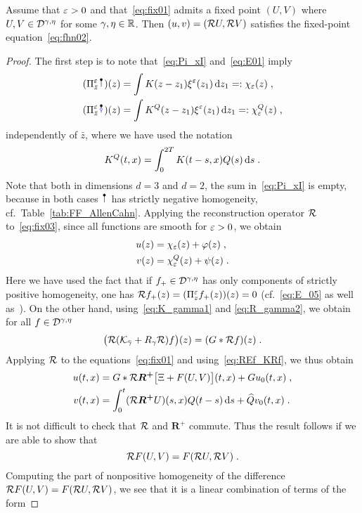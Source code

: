\documentclass[reqno,11pt]{article}
\def\Rplus{\boldsymbol{R^+}}
\def\KQ{K^Q}
\begin{document}
\begin{prop}
\label{prop:fixed_point_equiv}
Assume that $\varepsilon>0$ and that~\eqref{eq:fix01} admits a fixed point $(U,V)$
where $U, V\in{\mathcal D}^{\gamma,\eta}$ for some $\gamma, \eta\in\mathbb{R}$. Then $(u,v)=({\mathcal R}
U, {\mathcal R} V)$ satisfies the fixed-point equation~\eqref{eq:fhn02}.
\end{prop}
%
\begin{proof}
The first step is to note that~\eqref{eq:Pi_xI} and~\eqref{eq:E01} imply
\begin{align*}
 (\Pi_{\bar z}^\eps \RSI)(z) &= 
 \int K(z-z_1)\xi^\eps(z_1)\6z_1 =: \chi_\eps(z)\;, \\
 (\Pi_{\bar z}^\eps \RSoI)(z) &= 
 \int \KQ(z-z_1)\xi^\eps(z_1)\6z_1 =: \chi^Q_\eps(z)\;, 
\end{align*} 
independently of $\bar z$, where we have used the notation 
\[
 \KQ(t,x) = \int_0^{2T} K(t-s,x) Q(s)\6s\;.
\]
Note that both in dimensions $d=3$ and $d=2$, the sum in~\eqref{eq:Pi_xI}
is empty, because in both cases $\RSI$ has strictly negative homogeneity,
cf.\ Table~\ref{tab:FF_AllenCahn}.
Applying the reconstruction operator ${\mathcal R}$ to~\eqref{eq:fix03}, since all
functions are smooth for $\varepsilon>0$, we obtain
\begin{align*}
u(z) &= \chi_\varepsilon(z) + \varphi(z)\;, \\
v(z) &= \chi^Q_\varepsilon(z) + \psi(z)\;. 
\end{align*}
Here we have used the fact that if $f_+\in{\mathcal D}^{\gamma,\eta}$ has only components
of strictly positive homogeneity, one has ${\mathcal R} f_+(z) = (\Pi^\varepsilon_z f_+(z))(z) =
0$ (cf.~\eqref{eq:E_05} as well as~\cite[Prop.~3.28]{Hairer2014}). 
On the other hand, using~\eqref{eq:K_gamma1} and
\eqref{eq:R_gamma2}, we obtain for all $f\in{\mathcal D}^{\gamma,\eta}$ 
\[
 \bigl({\mathcal R}({\mathcal K}_{\bar\gamma} + R_\gamma{\mathcal R})f\bigr)(z) 
 = (G*{\mathcal R} f)(z)\;.
\]
Applying ${\mathcal R}$ to the equations~\eqref{eq:fix01} and using~\eqref{eq:REf_KRf},
we thus obtain 
\begin{align*}
u(t,x) &= G * \cR\Rplus \bigbrak{\Xi+F(U,V)}(t,x) + Gu_0(t,x)\;, \\
v(t,x) &= \int_0^t (\cR\Rplus U)(s,x) Q(t-s)\6s + \widehat Qv_0(t,x)\;.  
\end{align*}
It is not difficult to check that ${\mathcal R}$ and $\Rplus$ commute. Thus the result
follows if we are able to show that 
\[
 {\mathcal R} F(U,V) = F({\mathcal R} U, {\mathcal R} V)\;.
\]
Computing the part of nonpositive homogeneity of the difference ${\mathcal R} F(U,V) =
F({\mathcal R} U, {\mathcal R} V)$, we see that it is a linear combination of terms of the form 

\end{proof}
\end{document}
